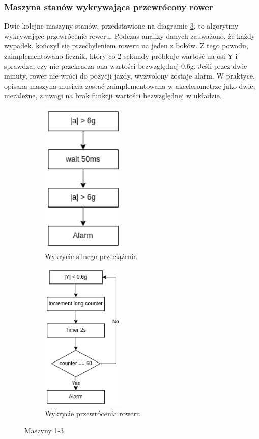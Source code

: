 \subsubsection{Maszyna stanów wykrywająca przewrócony rower}
Dwie kolejne maszyny stanów, przedstawione na diagramie \ref{img:fsm2}, to algorytmy wykrywające przewrócenie roweru. Podczas analizy danych zauważono, że każdy wypadek, kończył się przechyleniem roweru na jeden z boków. Z tego powodu, zaimplementowano licznik, który co 2 sekundy próbkuje wartość na osi Y i sprawdza, czy nie przekracza ona wartości bezwzględnej 0.6g. Jeśli przez dwie minuty, rower nie wróci do pozycji jazdy, wyzwolony zostaje alarm. W praktyce, opisana maszyna musiała zostać zaimplementowana w akcelerometrze jako dwie, niezależne, z uwagi na brak funkcji wartości bezwzględnej w układzie.
\begin{figure}[h]
    \centering
    \begin{subfigure}{4cm}
    \includegraphics[width=4cm]{Graphics/All_axis_FSM1.png}
    \caption{Wykrycie silnego przeciążenia}
    \label{img:fsm1}
    \end{subfigure}

    \begin{subfigure}{4cm}
    \includegraphics[width=4cm]{Graphics/overturned_FSM2_3.png}
    \caption{Wykrycie przewrócenia roweru}
    \label{img:fsm2}
    \end{subfigure}
    \caption{Maszyny 1-3}
\end{figure}
